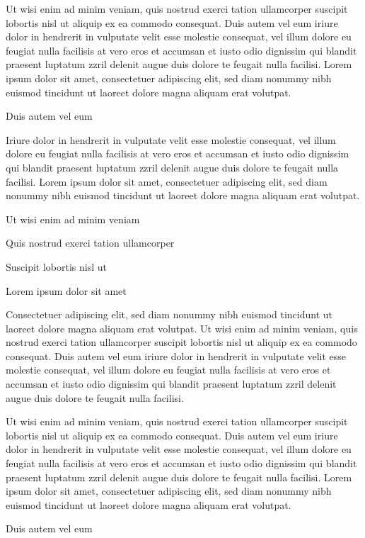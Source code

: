 \documentclass[11pt,twoside]{article}\makeatletter
\begin{document}
Ut wisi enim ad minim veniam, quis nostrud exerci tation ullamcorper suscipit lobortis nisl ut aliquip ex ea commodo consequat. Duis autem vel eum iriure dolor in hendrerit in vulputate velit esse molestie consequat, vel illum dolore eu feugiat nulla facilisis at vero eros et accumsan et iusto odio dignissim qui blandit praesent luptatum zzril delenit augue duis dolore te feugait nulla facilisi. Lorem ipsum dolor sit amet, consectetuer adipiscing elit, sed diam nonummy nibh euismod tincidunt ut laoreet dolore magna aliquam erat volutpat. \par
Duis autem vel eum \par
Iriure dolor in hendrerit in vulputate velit esse molestie consequat, vel illum dolore eu feugiat nulla facilisis at vero eros et accumsan et iusto odio dignissim qui blandit praesent luptatum zzril delenit augue duis dolore te feugait nulla facilisi. Lorem ipsum dolor sit amet, consectetuer adipiscing elit, sed diam nonummy nibh euismod tincidunt ut laoreet dolore magna aliquam erat volutpat. \par
Ut wisi enim ad minim veniam\par
Quis nostrud exerci tation ullamcorper \par
Suscipit lobortis nisl ut \par
Lorem ipsum dolor sit amet\par
Consectetuer adipiscing elit, sed diam nonummy nibh euismod tincidunt ut laoreet dolore magna aliquam erat volutpat. Ut wisi enim ad minim veniam, quis nostrud exerci tation ullamcorper suscipit lobortis nisl ut aliquip ex ea commodo consequat. Duis autem vel eum iriure dolor in hendrerit in vulputate velit esse molestie consequat, vel illum dolore eu feugiat nulla facilisis at vero eros et accumsan et iusto odio dignissim qui blandit praesent luptatum zzril delenit augue duis dolore te feugait nulla facilisi.\par
Ut wisi enim ad minim veniam, quis nostrud exerci tation ullamcorper suscipit lobortis nisl ut aliquip ex ea commodo consequat. Duis autem vel eum iriure dolor in hendrerit in vulputate velit esse molestie consequat, vel illum dolore eu feugiat nulla facilisis at vero eros et accumsan et iusto odio dignissim qui blandit praesent luptatum zzril delenit augue duis dolore te feugait nulla facilisi. Lorem ipsum dolor sit amet, consectetuer adipiscing elit, sed diam nonummy nibh euismod tincidunt ut laoreet dolore magna aliquam erat volutpat. \par
Duis autem vel eum \par
\end{document}
